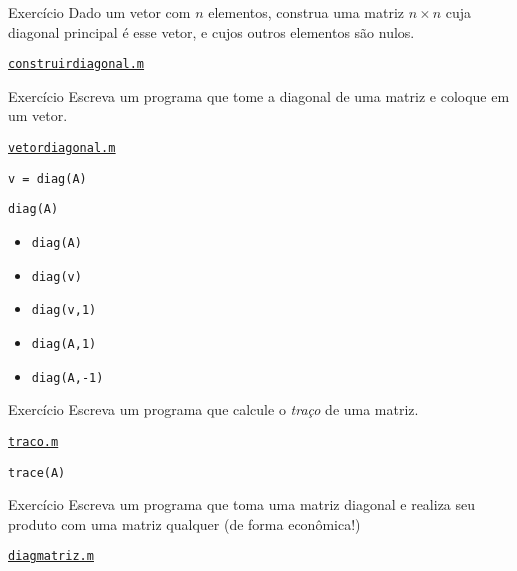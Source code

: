 \documentclass[hyperref={pdfpagelabels=false}]{beamer}
\begin{document}
\begin{frame}{Exercício}
  Dado um vetor com $n$ elementos, construa uma matriz $n\times n$ cuja diagonal principal é esse vetor, e cujos outros elementos são nulos.
  \vfill
  \begin{center} \href{listings/construirdiagonal.m}{\underline{\texttt{construirdiagonal.m}}} \end{center}
\end{frame}

\begin{frame}{Exercício}
  Escreva um programa que tome a diagonal de uma matriz e coloque em um vetor.
  \vfill
  \begin{center} \href{listings/vetordiagonal.m}{\underline{\texttt{vetordiagonal.m}}} \end{center}
  \begin{center} \texttt{v = diag(A)} \end{center}
\end{frame}

\begin{frame}{\texttt{diag(A)}}
  \begin{itemize}
  \item {\texttt{diag(A)}}
  \item {\texttt{diag(v)}}
  \item {\texttt{diag(v,1)}}
  \item {\texttt{diag(A,1)}}
  \item {\texttt{diag(A,-1)}}
  \end{itemize}
\end{frame}

\begin{frame}{Exercício}
  Escreva um programa que calcule o \emph{traço} de uma matriz.
  \vfill
  \begin{center} \href{listings/traco.m}{\underline{\texttt{traco.m}}} \end{center}
  \begin{center}{\texttt{trace(A)}}\end{center}
\end{frame}

\begin{frame}{Exercício}
  Escreva um programa que toma uma matriz diagonal e realiza seu produto com uma matriz qualquer (de forma econômica!)
  \vfill
  \begin{center} \href{listings/diagmatriz.m}{\underline{\texttt{diagmatriz.m}}} \end{center}
\end{frame}
\end{document}
